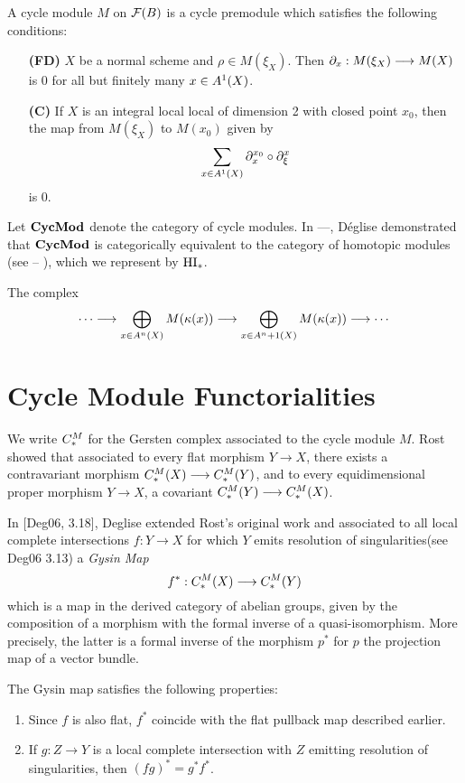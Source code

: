 \begin{definition}
A cycle module $M$ on $\fields(B)$ is a cycle premodule which
satisfies the following conditions:

\begin{enumerate}
\item[\textbf{(FD)}]  
$X$ be a normal scheme and $\rho \in M(\xi_X)$. Then $\res{x}: 
M(\xi_X) \to M(X)$ is 0 for all but finitely many $x \in 
\subsch{1}{X}$.

\item[\textbf{(C)}]  If $X$ is an integral
local local of dimension 2 with closed point $x_0$, then the map 
from $M(\xi_X)$ to $M(x_0)$ given by
\[
\sum_{x \in \subsch{1}{X}} \ptres{x_0}{x} \comp \ptres{x}{\xi}
\]
is 0.
\end{enumerate}
\end{definition}

Let $\CycMod$ denote the category of cycle modules. In ---,
D\'eglise demonstrated that $\CycMod$ is categorically 
equivalent to the category of homotopic modules (see -- ), which
we represent by $\HI_*$. 

\vskip 10pt
The complex \[\gersseq{M}\]

\section{Cycle Module Functorialities}\label{sect_cm_funct}

We write $\gcmplx{M}$ for the Gersten complex associated to the 
cycle module $M$. Rost showed that associated to every flat 
morphism $Y \to X$, there exists a contravariant morphism 
$\gcmplx{M}(X) \to \gcmplx{M}(Y)$, and to every equidimensional 
proper morphism $Y \to X$, a covariant $\gcmplx{M}(Y) \to 
\gcmplx{M}(X)$.

In [Deg06, 3.18], Deglise extended Rost's original work and 
associated to all local complete intersections $f: Y \to X$ for
which $Y$ emits resolution of singularities(see Deg06 3.13) a 
\emph{Gysin Map} 
\[
   f^*: \gcmplx{M}(X) \to \gcmplx{M}(Y)
\]
which is a map in the derived category of abelian groups, given 
by the composition of a morphism with the formal inverse of a 
quasi-isomorphism. More precisely, the latter is a formal inverse 
of the morphism $p^*$ for $p$ the projection map of a vector 
bundle. 

The Gysin map satisfies the following properties:
\begin{enumerate}
\item Since $f$ is also flat, $f^*$ coincide with the flat 
pullback map described earlier.

\item If $g: Z \to Y$ is a local complete intersection with $Z$
emitting resolution of singularities, then $(fg)^* = g^*f^*$.
\end{enumerate}

